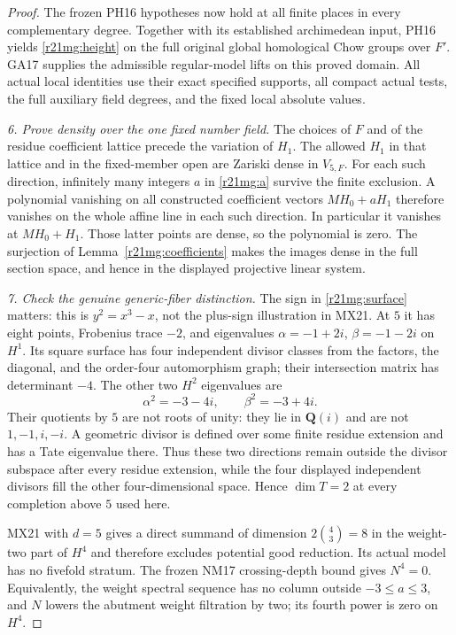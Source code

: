 \begin{proof}
The frozen PH16 hypotheses now hold at all finite places in every
complementary degree.  Together with its established archimedean
input, PH16 yields \eqref{r21mg:height} on the full original global
homological Chow groups over $F'$.  GA17 supplies the admissible
regular-model lifts on this proved domain.  All actual local
identities use their exact specified supports, all compact actual
tests, the full auxiliary field degrees, and the fixed local
absolute values.

\emph{6. Prove density over the one fixed number field.}
The choices of $F$ and of the residue coefficient lattice precede
the variation of $H_1$.  The allowed $H_1$ in that lattice and in
the fixed-member open are Zariski dense in $V_{5,F}$.
For each such direction, infinitely many integers $a$ in
\eqref{r21mg:a} survive the finite exclusion.  A polynomial
vanishing on all constructed coefficient vectors $MH_0+aH_1$
therefore vanishes on the whole affine line in each such direction.
In particular it vanishes at $MH_0+H_1$.  Those latter points
are dense, so the polynomial is zero.  The surjection of
Lemma~\ref{r21mg:coefficients} makes the images dense in the full
section space, and hence in the displayed projective linear system.

\emph{7. Check the genuine generic-fiber distinction.}
The sign in \eqref{r21mg:surface} matters: this is $y^2=x^3-x$,
not the plus-sign illustration in MX21.  At $5$ it has eight points,
Frobenius trace $-2$, and eigenvalues $\alpha=-1+2i$, $\beta=-1-2i$
on $H^1$.  Its square surface has four independent divisor classes
from the factors, the diagonal, and the order-four automorphism
graph; their intersection matrix has determinant $-4$.
The other two $H^2$ eigenvalues are
\[
                   \alpha^2=-3-4i,\qquad \beta^2=-3+4i.
 \tag{MG21.11}\label{r21mg:T}
\]
Their quotients by $5$ are not roots of unity: they lie in
$\mathbf Q(i)$ and are not $1,-1,i,-i$.  A geometric divisor is
defined over some finite residue extension and has a Tate
eigenvalue there.  Thus these two directions remain outside the
divisor subspace after every residue extension, while the four
displayed independent divisors fill the other four-dimensional
space.  Hence $\dim T=2$ at every completion above $5$ used here.

MX21 with $d=5$ gives a direct summand of dimension
$2\binom43=8$ in the weight-two part of $H^4$ and therefore excludes
potential good reduction.  Its actual model has no fivefold
stratum.  The frozen NM17 crossing-depth bound gives $N^4=0$.
Equivalently, the weight spectral sequence has no column outside
$-3\le a\le3$, and $N$ lowers the abutment weight filtration by
two; its fourth power is zero on $H^4$.


\end{proof}
